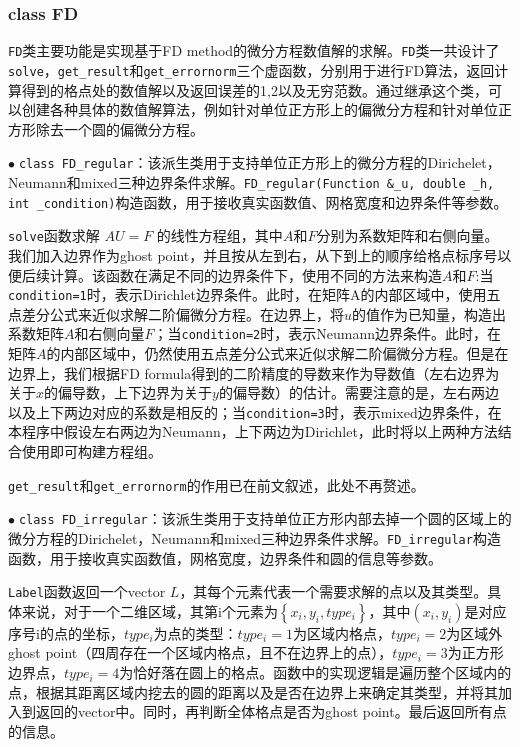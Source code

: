 \documentclass{ctexart}
\begin{document}
\begin{sloppypar}
\subsubsection{class FD}
\verb|FD|类主要功能是实现基于FD method的微分方程数值解的求解。\verb|FD|类一共设计了\verb|solve|，\verb|get_result|和\verb|get_errornorm|三个虚函数，分别用于进行FD算法，返回计算得到的格点处的数值解以及返回误差的1,2以及无穷范数。通过继承这个类，可以创建各种具体的数值解算法，例如针对单位正方形上的偏微分方程和针对单位正方形除去一个圆的偏微分方程。

$\bullet \;$\verb|class FD_regular|：该派生类用于支持单位正方形上的微分方程的Dirichelet，Neumann和mixed三种边界条件求解。\verb|FD_regular(Function &_u, double _h, int _condition)|构造函数，用于接收真实函数值、网格宽度和边界条件等参数。

\verb|solve|函数求解 $AU = F$ 的线性方程组，其中$A$和$F$分别为系数矩阵和右侧向量。我们加入边界作为ghost point，并且按从左到右，从下到上的顺序给格点标序号以便后续计算。该函数在满足不同的边界条件下，使用不同的方法来构造$A$和$F$:当\verb|condition=1|时，表示Dirichlet边界条件。此时，在矩阵A的内部区域中，使用五点差分公式来近似求解二阶偏微分方程。在边界上，将$u$的值作为已知量，构造出系数矩阵$A$和右侧向量$F$；当\verb|condition=2|时，表示Neumann边界条件。此时，在矩阵$A$的内部区域中，仍然使用五点差分公式来近似求解二阶偏微分方程。但是在边界上，我们根据FD formula得到的二阶精度的导数来作为导数值（左右边界为关于$x$的偏导数，上下边界为关于$y$的偏导数）的估计。需要注意的是，左右两边以及上下两边对应的系数是相反的；当\verb|condition=3|时，表示mixed边界条件，在本程序中假设左右两边为Neumann，上下两边为Dirichlet，此时将以上两种方法结合使用即可构建方程组。

\verb|get_result|和\verb|get_errornorm|的作用已在前文叙述，此处不再赘述。

$\bullet \;$\verb|class FD_irregular|：该派生类用于支持单位正方形内部去掉一个圆的区域上的微分方程的Dirichelet，Neumann和mixed三种边界条件求解。\verb|FD_irregular|构造函数，用于接收真实函数值，网格宽度，边界条件和圆的信息等参数。

\verb|Label|函数返回一个vector $L$，其每个元素代表一个需要求解的点以及其类型。具体来说，对于一个二维区域，其第i个元素为$\left\{x_i,y_i,type_i\right\}$，其中$(x_i,y_i)$是对应序号i的点的坐标，$type_i$为点的类型：$type_i=1$为区域内格点，$type_i=2$为区域外ghost point（四周存在一个区域内格点，且不在边界上的点），$type_i=3$为正方形边界点，$type_i=4$为恰好落在圆上的格点。函数中的实现逻辑是遍历整个区域内的点，根据其距离区域内挖去的圆的距离以及是否在边界上来确定其类型，并将其加入到返回的vector中。同时，再判断全体格点是否为ghost point。最后返回所有点的信息。


\end{sloppypar}
\end{document}
